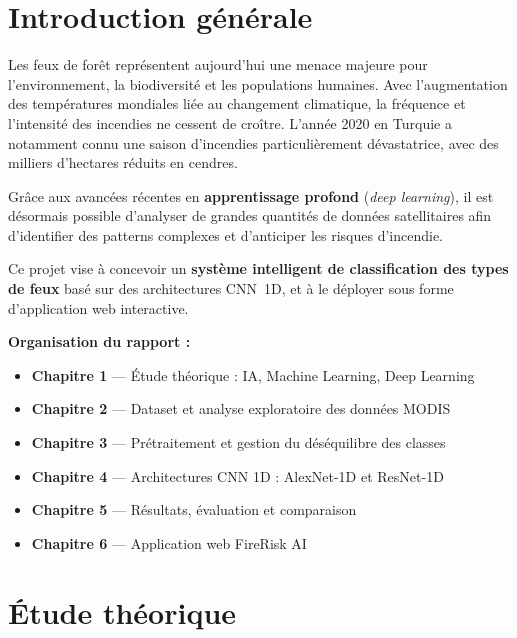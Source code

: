 \documentclass[12pt,a4paper]{report}
\begin{document}
\chapter*{Introduction g\'{e}n\'{e}rale}

\justifying
Les feux de for\^{e}t repr\'{e}sentent aujourd'hui une menace majeure pour l'environnement, la biodiversit\'{e} et les populations humaines. Avec l'augmentation des temp\'{e}ratures mondiales li\'{e}e au changement climatique, la fr\'{e}quence et l'intensit\'{e} des incendies ne cessent de cro\^{i}tre. L'ann\'{e}e 2020 en Turquie a notamment connu une saison d'incendies particuli\`{e}rement d\'{e}vastatrice, avec des milliers d'hectares r\'{e}duits en cendres.

Gr\^{a}ce aux avanc\'{e}es r\'{e}centes en \textbf{apprentissage profond} (\textit{deep learning}), il est d\'{e}sormais possible d'analyser de grandes quantit\'{e}s de donn\'{e}es satellitaires afin d'identifier des patterns complexes et d'anticiper les risques d'incendie.

Ce projet vise \`{a} concevoir un \textbf{syst\`{e}me intelligent de classification des types de feux} bas\'{e} sur des architectures CNN~1D, et \`{a} le d\'{e}ployer sous forme d'application web interactive.

\medskip
\textbf{Organisation du rapport :}
\begin{itemize}
    \item \textbf{Chapitre 1} --- \'{E}tude th\'{e}orique : IA, Machine Learning, Deep Learning
    \item \textbf{Chapitre 2} --- Dataset et analyse exploratoire des donn\'{e}es MODIS
    \item \textbf{Chapitre 3} --- Pr\'{e}traitement et gestion du d\'{e}s\'{e}quilibre des classes
    \item \textbf{Chapitre 4} --- Architectures CNN 1D : AlexNet-1D et ResNet-1D
    \item \textbf{Chapitre 5} --- R\'{e}sultats, \'{e}valuation et comparaison
    \item \textbf{Chapitre 6} --- Application web FireRisk AI
\end{itemize}

\chapter{\'{E}tude th\'{e}orique}
\end{document}
